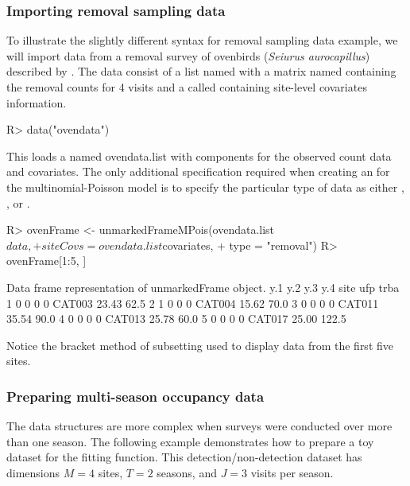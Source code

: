 \documentclass[article,shortnames]{jss}
\begin{document}
{\subsubsection{Importing removal sampling data}

To illustrate the slightly different syntax for removal sampling data example,
we will import data from a removal survey of ovenbirds
({\it Seiurus aurocapillus}) described by \citet{Royle2004a}.  The data consist
of a list named  with
a matrix named  containing the removal counts for 4 visits and a
 called  containing site-level covariates
information.

\begin{Schunk}
\begin{Sinput}
R> data("ovendata")
\end{Sinput}
\end{Schunk}

This loads a  named ovendata.list with components for the
observed count data and covariates.  The only additional specification
required when creating an  for the multinomial-Poisson
model is to specify the particular type of data as either
, , or .


\begin{Schunk}
\begin{Sinput}
R> ovenFrame <- unmarkedFrameMPois(ovendata.list$data, 
+     siteCovs = ovendata.list$covariates, 
+     type = "removal")
R> ovenFrame[1:5, ]
\end{Sinput}
\begin{Soutput}
Data frame representation of unmarkedFrame object.
  y.1 y.2 y.3 y.4   site   ufp  trba
1   0   0   0   0 CAT003 23.43  62.5
2   1   0   0   0 CAT004 15.62  70.0
3   0   0   0   0 CAT011 35.54  90.0
4   0   0   0   0 CAT013 25.78  60.0
5   0   0   0   0 CAT017 25.00 122.5
\end{Soutput}
\end{Schunk}



Notice the bracket method of subsetting used to display data from the first
five sites.

\subsubsection{Preparing multi-season occupancy data}

The data structures are more complex when surveys were conducted over more
than one season. The following example demonstrates how to prepare a toy
dataset for the  fitting function. This detection/non-detection
dataset has dimensions $M=4$ sites, $T=2$ seasons, and $J=3$ visits per season.


}
\end{document}
